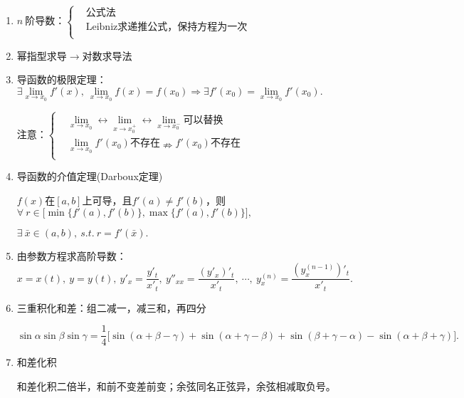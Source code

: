 \documentclass[UTF8]{ctexart}
\numberwithin{equation}{section}
\numberwithin{figure}{section}
\numberwithin{table}{section}
\newcommand\dis{\displaystyle}
\newcommand\limit{\dis\lim\limits}
\begin{document}
\begin{spacing}{2}
\begin{enumerate}[itemindent=1.4em, label=(\arabic*)]
\item $n\ \text{阶导数：}\left\{\begin{aligned}
&\text{公式法}\\
&\text{Leibniz求递推公式，保持方程为一次}\\
\end{aligned}\right.$

\vspace{0.2cm}

\item 幂指型求导$\longrightarrow$对数求导法

\item 导函数的极限定理：$\exists\limit_{x\to x_0}f'(x),\ \limit_{x\to x_0}f(x)=f(x_0)
\Longrightarrow\exists f'(x_0)=\limit_{x\to x_0}f'(x_0).$

$\text{注意：}\left\{\begin{aligned}
&\limit_{x\to x_0}\longleftrightarrow\limit_{x\to x_0^+}
\longleftrightarrow\limit_{x\to x_0^-}\text{可以替换}\\
&\limit_{x\to x_0}f'(x_0)\text{不存在}\nRightarrow f'(x_0)\text{不存在}\\
\end{aligned}\right.$

\item 导函数的介值定理(Darboux定理)

$f(x)$在$[a,b]$上可导，且$f'(a)\neq f'(b)$，则$\forall\ r\in 
\big[\min\{f'(a),f'(b)\},\max\{f'(a),f'(b)\}\big],$

$\exists\ \bar{x}\in(a,b),\ s.t.\ r=f'(\bar{x}).$

\item 由参数方程求高阶导数：$x=x(t),\ y=y(t),\ y'_x=\dfrac{y'_t}{x'_t},\ 
y''_{xx}=\dfrac{(y'_x)'_t}{x'_t},\ \cdots,\ y_x^{(n)}=\dfrac{\left(y_{x}^{(n-1)}\right)'_t}{x'_t}.$

\item 三重积化和差：组二减一，减三和，再四分

$\sin\alpha\sin\beta\sin\gamma=\dfrac{1}{4}\big[\sin(\alpha+\beta-\gamma)
+\sin(\alpha+\gamma-\beta)+\sin(\beta+\gamma-\alpha)
-\sin(\alpha+\beta+\gamma)\big].$

\item 和差化积

 \textcolor[rgb]{1,0,0}{和差化积二倍半，和前不变差前变；余弦同名正弦异，余弦相减取负号。}

\vspace{0.3cm}


\end{enumerate}
\end{spacing}
\end{document}
